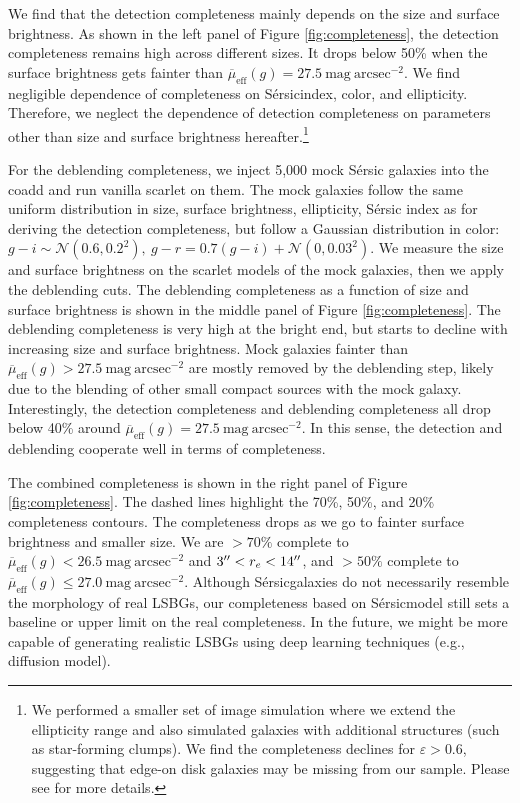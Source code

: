 \documentclass[twocolumn,astrosymb,twocolappendix]{aastex631}
\newcommand{\sbunit}{\mathrm{mag\ arcsec}^{-2}}
\newcommand{\sbeff}{\overline{\mu}_{\mathrm{eff}}(g)}
\newcommand{\sersic}{S\'ersic}
\begin{document}
\begin{CJK*}{UTF8}{gbsn}
We find that the detection completeness mainly depends on the size and surface brightness. As shown in the left panel of Figure \ref{fig:completeness}, the detection completeness remains high across different sizes. It drops below 50\% when the surface brightness gets fainter than $\sbeff = 27.5\ \sbunit$. We find negligible dependence of completeness on \sersic index, color, and ellipticity. Therefore, we neglect the dependence of detection completeness on parameters other than size and surface brightness hereafter.\footnote{We performed a smaller set of image simulation where we extend the ellipticity range and also simulated galaxies with additional structures (such as star-forming clumps). We find the completeness declines for $\varepsilon > 0.6$, suggesting that edge-on disk galaxies may be missing from our sample. Please see \citet{Greene2022} for more details.}

For the deblending completeness, we inject 5,000 mock \sersic{} galaxies into the coadd and run vanilla scarlet on them. The mock galaxies follow the same uniform distribution in size, surface brightness, ellipticity, \sersic{} index as for deriving the detection completeness, but follow a Gaussian distribution in color: $g-i \sim \mathcal{N}(0.6, 0.2^2),\ g-r = 0.7 (g-i) + \mathcal{N}(0, 0.03^2)$. We measure the size and surface brightness on the scarlet models of the mock galaxies, then we apply the deblending cuts. The deblending completeness as a function of size and surface brightness is shown in the middle panel of Figure \ref{fig:completeness}. The deblending completeness is very high at the bright end, but starts to decline with increasing size and surface brightness. Mock galaxies fainter than $\sbeff > 27.5\ \sbunit$ are mostly removed by the deblending step, likely due to the blending of other small compact sources with the mock galaxy. Interestingly, the detection completeness and deblending completeness all drop below 40\% around $\sbeff=27.5\ \sbunit$. In this sense, the detection and deblending cooperate well in terms of completeness. 

The combined completeness is shown in the right panel of Figure \ref{fig:completeness}. The dashed lines highlight the 70\%, 50\%, and 20\% completeness contours. The completeness drops as we go to fainter surface brightness and smaller size. We are $>70\%$ complete to $\sbeff < 26.5\ \sbunit$ and $3\mbox{$^{\prime\prime}$} < r_e < 14\mbox{$^{\prime\prime}$}$, and $>50\%$ complete to $\sbeff \leqslant 27.0\ \sbunit$. Although \sersic galaxies do not necessarily resemble the morphology of real LSBGs, our completeness based on \sersic model still sets a baseline or upper limit on the real completeness. In the future, we might be more capable of generating realistic LSBGs using deep learning techniques (e.g., diffusion model). 



\end{CJK*}
\end{document}
